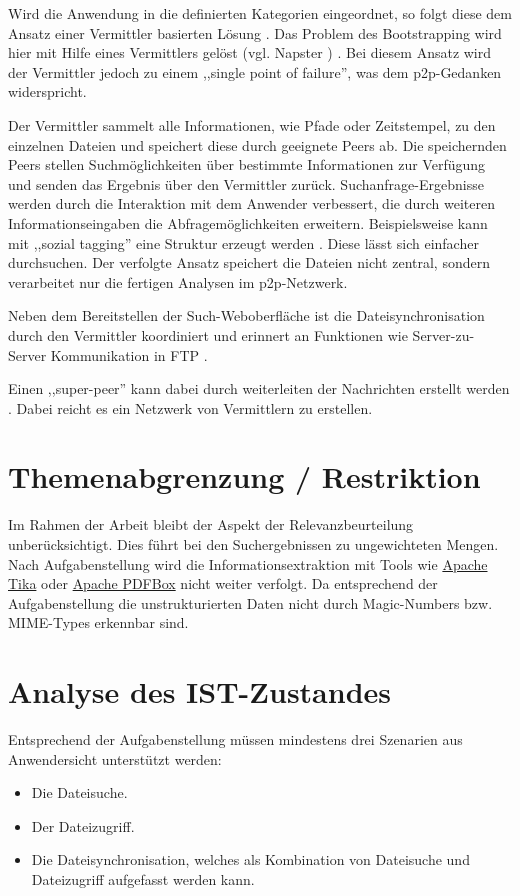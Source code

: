 \documentclass[oneside, ngerman, toc=bibliography,bibliography=totoc,listof=entryprefix, open=right,numbers=noenddot,fontsize=12pt]{scrbook}
\begin{document}
Wird die Anwendung in die definierten Kategorien eingeordnet, so folgt diese dem Ansatz einer Vermittler basierten Lösung \cite{backx2002comparison}. Das Problem des Bootstrapping wird hier mit Hilfe eines Vermittlers gelöst (vgl. { Napster} \cite{mahlmann2007peer}) \cite{4144906}. Bei diesem Ansatz wird der Vermittler jedoch zu einem ,,single point of failure'', was dem \acrshort{p2p}-Gedanken widerspricht. 

Der Vermittler sammelt alle Informationen, wie Pfade oder Zeitstempel, zu den einzelnen Dateien und speichert diese durch geeignete Peers ab. Die speichernden Peers stellen Suchmöglichkeiten über bestimmte Informationen zur Verfügung und senden das Ergebnis über den Vermittler zurück.
Suchanfrage-Ergebnisse werden durch die Interaktion mit dem Anwender verbessert, die durch weiteren Informationseingaben die Abfragemöglichkeiten erweitern.
Beispielsweise kann mit ,,sozial tagging'' eine Struktur erzeugt werden \cite{gaiser2008good}. Diese lässt sich einfacher durchsuchen. Der verfolgte Ansatz speichert die Dateien nicht zentral, sondern verarbeitet nur die fertigen Analysen im \acrshort{p2p}-Netzwerk.

Neben dem Bereitstellen der Such-Weboberfläche ist die Dateisynchronisation durch den Vermittler koordiniert und erinnert an Funktionen wie Server-zu-Server Kommunikation in FTP \cite{rfc959}.

Einen ,,super-peer'' kann dabei durch weiterleiten der Nachrichten erstellt werden \cite{yang2003designing}. Dabei reicht es ein Netzwerk von Vermittlern zu erstellen.

\section{Themenabgrenzung / Restriktion}
Im Rahmen der Arbeit bleibt der Aspekt der Relevanzbeurteilung unberücksichtigt. Dies führt bei den Suchergebnissen zu ungewichteten Mengen. Nach Aufgabenstellung wird die Informationsextraktion mit Tools wie \href{http://tika.apache.org/}{Apache Tika} oder  \href{http://pdfbox.apache.org/}{Apache PDFBox} nicht weiter verfolgt. Da  entsprechend der Aufgabenstellung die unstrukturierten Daten nicht durch {Magic-Numbers bzw. MIME-Types} erkennbar sind.


\section{Analyse des IST-Zustandes}\label{sec:ist}

Entsprechend der Aufgabenstellung müssen mindestens drei Szenarien aus Anwendersicht unterstützt werden:
\begin{itemize}
	\item Die Dateisuche.
    \item Der Dateizugriff.
    \item Die Dateisynchronisation, welches als Kombination von Dateisuche und Dateizugriff aufgefasst werden kann.
\end{itemize}
\end{document}

